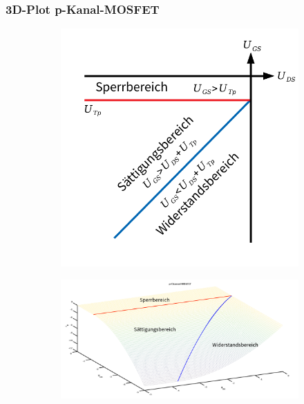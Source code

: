 \documentclass[a4paper,11pt]{article}
\begin{document}
\subsubsection*{3D-Plot p-Kanal-MOSFET}
\begin{figure}[H]
\begin{subfigure}{0.32\textwidth}
	\begin{center}
		\includegraphics[width=\textwidth]{img/pmosfet_operationmodes.pdf}
	\end{center}
\end{subfigure}
\begin{subfigure}{0.67\textwidth}
	\begin{center}
		\includegraphics[width=\textwidth]{img/pmosfet_3dplot}
	\end{center}
\end{subfigure}
\end{figure}
\end{document}

